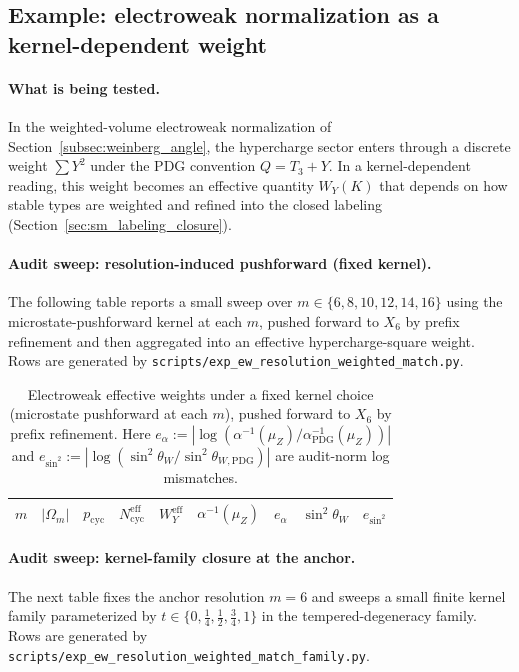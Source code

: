 \subsection{Example: electroweak normalization as a kernel-dependent weight}
\label{subsec:kernel_family_example_ew}

\paragraph{What is being tested.}
\InterfaceTag In the weighted-volume electroweak normalization of Section~\ref{subsec:weinberg_angle}, the hypercharge sector enters through a discrete weight $\sum Y^2$ under the PDG convention $Q=T_3+Y$.
In a kernel-dependent reading, this weight becomes an effective quantity $W_Y(K)$ that depends on how stable types are weighted and refined into the closed labeling (Section~\ref{sec:sm_labeling_closure}).

\paragraph{Audit sweep: resolution-induced pushforward (fixed kernel).}
\AuditTag The following table reports a small sweep over $m\in\{6,8,10,12,14,16\}$ using the microstate-pushforward kernel at each $m$, pushed forward to $X_6$ by prefix refinement and then aggregated into an effective hypercharge-square weight.
Rows are generated by \texttt{scripts/exp\_ew\_resolution\_weighted\_match.py}.

\begin{table}[H]
\centering
\scriptsize
\setlength{\tabcolsep}{6pt}
\renewcommand{\arraystretch}{1.15}
\begin{tabular}{rrrrrrrrr}
\toprule
$m$ & $|\Omega_m|$ & $p_{\mathrm{cyc}}$ & $N^{\mathrm{eff}}_{\mathrm{cyc}}$ & $W_Y^{\mathrm{eff}}$ &
$\alpha^{-1}(\mu_Z)$ & $e_\alpha$ & $\sin^2\theta_W$ & $e_{\sin^2}$ \\
\midrule
%
\end{tabular}
\caption{Electroweak effective weights under a fixed kernel choice (microstate pushforward at each $m$), pushed forward to $X_6$ by prefix refinement.
Here $e_\alpha:=|\log(\alpha^{-1}(\mu_Z)/\alpha^{-1}_{\mathrm{PDG}}(\mu_Z))|$ and $e_{\sin^2}:=|\log(\sin^2\theta_W/\sin^2\theta_{W,\mathrm{PDG}})|$ are audit-norm log mismatches.}
\label{tab:ew_kernel_resolution_weighted}
\end{table}

\paragraph{Audit sweep: kernel-family closure at the anchor.}
\AuditTag The next table fixes the anchor resolution $m=6$ and sweeps a small finite kernel family parameterized by $t\in\{0,\tfrac14,\tfrac12,\tfrac34,1\}$ in the tempered-degeneracy family.
Rows are generated by \texttt{scripts/exp\_ew\_resolution\_weighted\_match\_family.py}.

